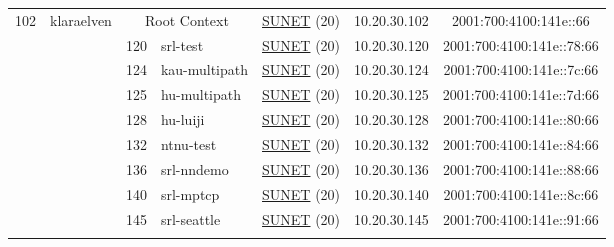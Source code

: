 \begin{small}
\begin{center}
\begin{longtable}{|c|c|c|c|c|c|c|c|}
 \multirow{11}{*}{\tiny{102}} & \multicolumn{1}{|l|}{\multirow{11}{*}{\tiny{klaraelven}}} & \multicolumn{2}{|c|}{\tiny{Root Context}} & \multicolumn{2}{|c|}{\tiny{\href{http://www.sunet.se}{SUNET} (20)}} & \tiny{10.20.30.102} & \tiny{2001:700:4100:141e::66} \\* \cline{3-3}\cline{4-4}\cline{5-5}\cline{6-6}\cline{7-7}\cline{8-8}
  &  & \tiny{120} & \multicolumn{1}{|l|}{\tiny{srl-test}} & \multicolumn{2}{|c|}{\tiny{\href{http://www.sunet.se}{SUNET} (20)}} & \tiny{10.20.30.120} & \tiny{2001:700:4100:141e::78:66} \\* \cline{3-3}\cline{4-4}\cline{5-5}\cline{6-6}\cline{7-7}\cline{8-8}
  &  & \tiny{124} & \multicolumn{1}{|l|}{\tiny{kau-multipath}} & \multicolumn{2}{|c|}{\tiny{\href{http://www.sunet.se}{SUNET} (20)}} & \tiny{10.20.30.124} & \tiny{2001:700:4100:141e::7c:66} \\* \cline{3-3}\cline{4-4}\cline{5-5}\cline{6-6}\cline{7-7}\cline{8-8}
  &  & \tiny{125} & \multicolumn{1}{|l|}{\tiny{hu-multipath}} & \multicolumn{2}{|c|}{\tiny{\href{http://www.sunet.se}{SUNET} (20)}} & \tiny{10.20.30.125} & \tiny{2001:700:4100:141e::7d:66} \\* \cline{3-3}\cline{4-4}\cline{5-5}\cline{6-6}\cline{7-7}\cline{8-8}
  &  & \tiny{128} & \multicolumn{1}{|l|}{\tiny{hu-luiji}} & \multicolumn{2}{|c|}{\tiny{\href{http://www.sunet.se}{SUNET} (20)}} & \tiny{10.20.30.128} & \tiny{2001:700:4100:141e::80:66} \\* \cline{3-3}\cline{4-4}\cline{5-5}\cline{6-6}\cline{7-7}\cline{8-8}
  &  & \tiny{132} & \multicolumn{1}{|l|}{\tiny{ntnu-test}} & \multicolumn{2}{|c|}{\tiny{\href{http://www.sunet.se}{SUNET} (20)}} & \tiny{10.20.30.132} & \tiny{2001:700:4100:141e::84:66} \\* \cline{3-3}\cline{4-4}\cline{5-5}\cline{6-6}\cline{7-7}\cline{8-8}
  &  & \tiny{136} & \multicolumn{1}{|l|}{\tiny{srl-nndemo}} & \multicolumn{2}{|c|}{\tiny{\href{http://www.sunet.se}{SUNET} (20)}} & \tiny{10.20.30.136} & \tiny{2001:700:4100:141e::88:66} \\* \cline{3-3}\cline{4-4}\cline{5-5}\cline{6-6}\cline{7-7}\cline{8-8}
  &  & \tiny{140} & \multicolumn{1}{|l|}{\tiny{srl-mptcp}} & \multicolumn{2}{|c|}{\tiny{\href{http://www.sunet.se}{SUNET} (20)}} & \tiny{10.20.30.140} & \tiny{2001:700:4100:141e::8c:66} \\* \cline{3-3}\cline{4-4}\cline{5-5}\cline{6-6}\cline{7-7}\cline{8-8}
  &  & \tiny{145} & \multicolumn{1}{|l|}{\tiny{srl-seattle}} & \multicolumn{2}{|c|}{\tiny{\href{http://www.sunet.se}{SUNET} (20)}} & \tiny{10.20.30.145} & \tiny{2001:700:4100:141e::91:66} \\* \cline{3-3}\cline{4-4}\cline{5-5}\cline{6-6}\cline{7-7}\cline{8-8}

\end{longtable}
\end{center}
\end{small}
